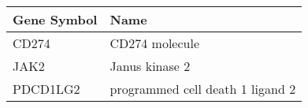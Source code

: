 \begin{tabular}{ll}
\toprule
Gene Symbol &                             Name \\
\midrule
      CD274 &                   CD274 molecule \\
       JAK2 &                   Janus kinase 2 \\
   PDCD1LG2 & programmed cell death 1 ligand 2 \\
\bottomrule
\end{tabular}
